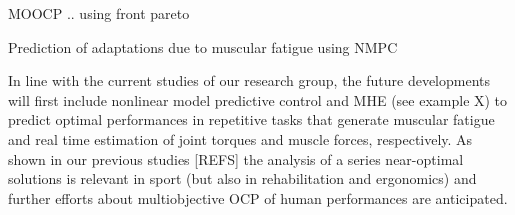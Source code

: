 MOOCP .. using front pareto

Prediction of adaptations due to muscular fatigue using NMPC

In line with the current studies of our research group, the future developments will first include nonlinear model predictive control and MHE (see example X) to predict optimal performances in repetitive tasks that generate muscular fatigue and real time estimation of joint torques and muscle forces, respectively. As shown in our previous studies [REFS] the analysis of a series near-optimal solutions is relevant in sport (but also in rehabilitation and ergonomics) and further efforts about multiobjective OCP of human performances are anticipated. 
